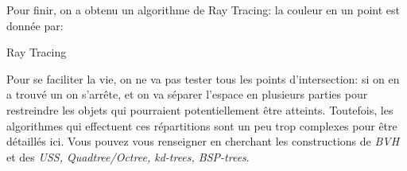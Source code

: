 \documentclass{classe}
\begin{document}
Pour finir, on a obtenu un algorithme de Ray Tracing: la couleur en un point est donnée par:
\begin{algorithm}[H]
	\caption{Ray Tracing}
	\begin{algorithmic}
				\Else
				\EndIf
			\EndIf
		\EndFunction
	\end{algorithmic}
\end{algorithm}

Pour se faciliter la vie, on ne va pas tester tous les points d'intersection: si on en a trouvé un on s'arrête, et on va séparer l'espace en plusieurs parties pour restreindre les objets qui pourraient potentiellement être atteints.
Toutefois, les algorithmes qui effectuent ces répartitions sont un peu trop complexes pour être détaillés ici.
Vous pouvez vous renseigner en cherchant les constructions de \emph{BVH} et des \emph{USS, Quadtree/Octree, kd-trees, BSP-trees}.
\end{document}
